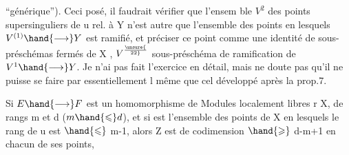 
 ``générique'').   Ceci posé, il faudrait vérifier que l'ensem ble $V^2$
des points supersinguliers de u rel. à Y n'est autre que l'ensemble des
points en lesquels $V^{(1)} \hand{\longrightarrow} Y$ est ramifié, et préciser ce point
comme une identité de sous-préschémas fermés de X , $V^{\unsure{\over{2}{2}}}$ \over{=}{=} sous-préschéma
de ramification de $V^1 \hand{\longrightarrow} Y$. Je n'ai pas fait l'exercice en détail,
mais ne doute pas qu'il ne puisse se faire par essentiellement l même
  que cel développé après la prop.7.

 Si $E \hand{\longrightarrow} F$ est un homomorphisme de Modules localement libres r 
X, de rangs m et d ($m \hand{\leqslant} d$), et si  est l'ensemble des points de X en
lesquels le rang de u est $\hand{\leqslant}$ m-1, alors  Z est de codimension $\hand{\geqslant}$ d-m+1
en chacun de ses points, 

